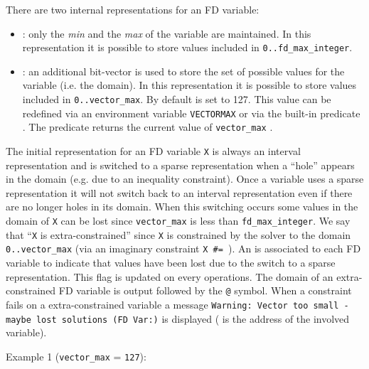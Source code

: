 There are two internal representations for an FD variable:

\begin{itemize}

\item {}: only the \emph{min} and the
  \emph{max} of the variable are maintained. In this representation it is
  possible to store values included in \texttt{0..fd\_max\_integer}.

\item {}: an additional bit-vector is used to
  store the set of possible values for the variable (i.e. the domain). In
  this representation it is possible to store values included in
  \texttt{0..vector\_max}. By default  is set to 127.
  This value can be redefined via an environment variable \texttt{VECTORMAX}
  or via the built-in predicate 
  .  The predicate 
  returns the current value of \texttt{vector\_max}
  .

\end{itemize}

The initial representation for an FD variable \texttt{X} is always an
interval representation and is switched to a sparse representation when a
``hole'' appears in the domain (e.g. due to an inequality constraint). Once a
variable uses a sparse representation it will not switch back to an interval
representation even if there are no longer holes in its domain. When this
switching occurs some values in the domain of \texttt{X} can be lost since
\texttt{vector\_max} is less than \texttt{fd\_max\_integer}. We say that
``\texttt{X} is extra-constrained'' since
\texttt{X} is constrained by the solver to the domain
\texttt{0..vector\_max} (via an imaginary constraint
\texttt{X \#={\lt} }). An  is
associated to each FD variable to indicate that values have been lost due to
the switch to a sparse representation. This flag is updated on every
operations. The domain of an extra-constrained FD variable is output followed
by the \texttt{@} symbol. When a constraint fails on a extra-constrained
variable a message \texttt{Warning: Vector too small - maybe lost solutions
  (FD Var:)} is displayed ( is the address of the involved
variable).

Example 1 (\texttt{vector\_max} = \texttt{127}):

